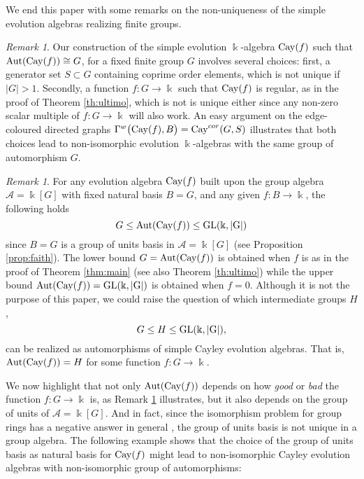 \documentclass[a4paper,12pt]{amsart}
\theoremstyle{definition}
\theoremstyle{remark}
\newtheorem{remark}[theorem]{Remark}
\newcommand{\Aut}{\operatorname{Aut}}
\newcommand{\Cay}{{\rm Cay}}
\newcommand{\A}{\mathcal{A}}
\begin{document}
We end this paper with some remarks on the non-uniqueness of the simple evolution algebras realizing finite groups.

\begin{remark}\label{rmk:not_unique}
Our construction of the simple evolution $\Bbbk$-algebra $\Cay(f) $ such that $\Aut(\Cay(f))\cong G$, for a fixed finite group $G$ involves several choices: first,  a generator set $S\subset G$ containing coprime order elements, which is not unique if $|G|>1$. Secondly,  a function $f\colon G\to \Bbbk$ such that $\Cay(f)$ is regular, as in the proof of Theorem \ref{th:ultimo}, which is not is unique either since any non-zero scalar multiple of $f\colon G\to \Bbbk$  will also work.  An easy argument on the edge-coloured directed graphs $\Gamma^w\big(\Cay(f),B\big)=\Cay^{cor}(G,S)$ illustrates that both choices lead to non-isomorphic evolution $\Bbbk$-algebras with the same group of automorphism $G$.
\end{remark}


\begin{remark}\label{rmk:bounds}
For any evolution algebra $\Cay(f)$ built upon the group algebra $\A=\Bbbk[G]$ with fixed natural basis $B=G$, and any given $f\colon B\to \Bbbk$,  the following  holds $$G\leq\Aut(\Cay(f))\leq \rm{GL}(\Bbbk, |G|)$$ since $B=G$ is a  group of units basis in  $\A=\Bbbk[G]$ (see Proposition \ref{prop:faith}). The lower bound  $G= \Aut(\Cay(f))$ is obtained when $f$ is as in the proof of Theorem \ref{thm:main} (see also Theorem \ref{th:ultimo}) while the upper bound  $\Aut(\Cay(f))=\rm{GL}(\Bbbk, |G|)$ is obtained when $f= 0$.   Although it is not the purpose of this paper, we could raise  the question of  which  intermediate groups  $H$,   $$G\leq H\leq \rm{GL}(\Bbbk, |G|),$$  can be realized as automorphisms of simple Cayley evolution algebras. That is,   $\Aut(\Cay(f))= H$ for  some function $f\colon G\to \Bbbk$.
\end{remark}
We now highlight that not only $\Aut(\Cay(f))$ depends on how \emph{good} or \emph{bad} the function $f: G \rightarrow \Bbbk$ is, as Remark \ref{rmk:bounds} illustrates, but it also depends on the group of units of $\A=\Bbbk[G]$.  And in fact,  since the isomorphism problem for group rings \cite[Problem 1.1]{Sandling} has a negative answer in general \cite{Hert},  the group of units basis is not unique in a group algebra.  The following example shows that the choice of the group of units basis as natural basis for  $\Cay(f)$ might lead to non-isomorphic Cayley evolution algebras with non-isomorphic group of automorphisms:
\end{document}
